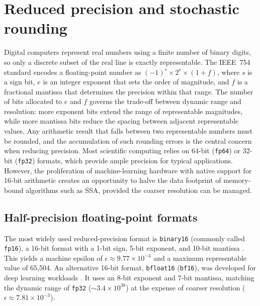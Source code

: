 \documentclass{article}
\begin{document}
\section{Reduced precision and stochastic rounding}
\label{sec:rp_sr}

Digital computers represent real numbers using a finite number of binary digits, so only a discrete subset of the real line is exactly representable. The IEEE~754 standard encodes a floating-point number as $(-1)^s \times 2^{e} \times (1 + f)$, where $s$ is a sign bit, $e$ is an integer exponent that sets the order of magnitude, and $f$ is a fractional mantissa that determines the precision within that range. The number of bits allocated to $e$ and $f$ governs the trade-off between dynamic range and resolution: more exponent bits extend the range of representable magnitudes, while more mantissa bits reduce the spacing between adjacent representable values. Any arithmetic result that falls between two representable numbers must be rounded, and the accumulation of such rounding errors is the central concern when reducing precision. Most scientific computing relies on 64-bit (\texttt{fp64}) or 32-bit (\texttt{fp32}) formats, which provide ample precision for typical applications. However, the proliferation of machine-learning hardware with native support for 16-bit arithmetic creates an opportunity to halve the data footprint of memory-bound algorithms such as SSA, provided the coarser resolution can be managed.

\subsection{Half-precision floating-point formats}

The most widely used reduced-precision format is \texttt{binary16} (commonly called \texttt{fp16}), a 16-bit format with a 1-bit sign, 5-bit exponent, and 10-bit mantissa \cite{ieee754_2019}. This yields a machine epsilon of $\epsilon \approx 9.77 \times 10^{-4}$ and a maximum representable value of 65,504. An alternative 16-bit format, \texttt{bfloat16} (\texttt{bf16}), was developed for deep learning workloads \cite{kalamkar2019}. It uses an 8-bit exponent and 7-bit mantissa, matching the dynamic range of \texttt{fp32} ($\sim 3.4 \times 10^{38}$) at the expense of coarser resolution ($\epsilon \approx 7.81 \times 10^{-3}$).
\end{document}
